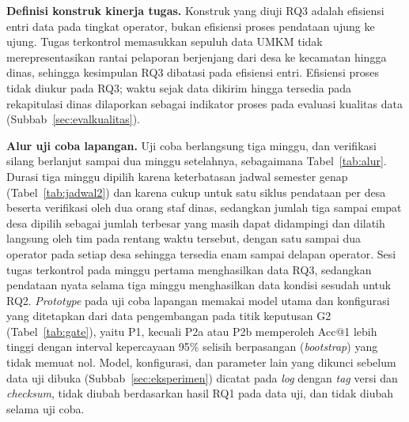 \textbf{Definisi konstruk kinerja tugas.} Konstruk yang diuji RQ3 adalah efisiensi entri data pada tingkat operator, bukan efisiensi proses pendataan ujung ke ujung. Tugas terkontrol memasukkan sepuluh data UMKM tidak merepresentasikan rantai pelaporan berjenjang dari desa ke kecamatan hingga dinas, sehingga kesimpulan RQ3 dibatasi pada efisiensi entri. Efisiensi proses tidak diukur pada RQ3; waktu sejak data dikirim hingga tersedia pada rekapitulasi dinas dilaporkan sebagai indikator proses pada evaluasi kualitas data (Subbab~\ref{sec:evalkualitas}).

\textbf{Alur uji coba lapangan.} Uji coba berlangsung tiga minggu, dan verifikasi silang berlanjut sampai dua minggu setelahnya, sebagaimana Tabel~\ref{tab:alur}. Durasi tiga minggu dipilih karena keterbatasan jadwal semester genap (Tabel~\ref{tab:jadwal2}) dan karena cukup untuk satu siklus pendataan per desa beserta verifikasi oleh dua orang staf dinas, sedangkan jumlah tiga sampai empat desa dipilih sebagai jumlah terbesar yang masih dapat didampingi dan dilatih langsung oleh tim pada rentang waktu tersebut, dengan satu sampai dua operator pada setiap desa sehingga tersedia enam sampai delapan operator. Sesi tugas terkontrol pada minggu pertama menghasilkan data RQ3, sedangkan pendataan nyata selama tiga minggu menghasilkan data kondisi sesudah untuk RQ2. \textit{Prototype} pada uji coba lapangan memakai model utama dan konfigurasi yang ditetapkan dari data pengembangan pada titik keputusan G2 (Tabel~\ref{tab:gate}), yaitu P1, kecuali P2a atau P2b memperoleh Acc@1 lebih tinggi dengan interval kepercayaan 95\% selisih berpasangan (\textit{bootstrap}) yang tidak memuat nol. Model, konfigurasi, dan parameter lain yang dikunci sebelum data uji dibuka (Subbab~\ref{sec:eksperimen}) dicatat pada \textit{log} dengan \textit{tag} versi dan \textit{checksum}, tidak diubah berdasarkan hasil RQ1 pada data uji, dan tidak diubah selama uji coba.

